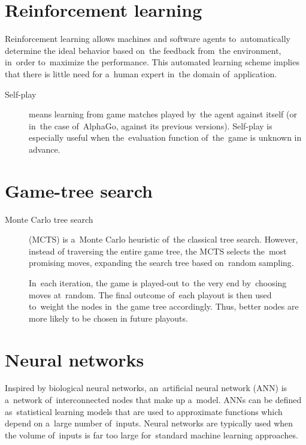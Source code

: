 \documentclass[a4paper,10pt]{article}
\begin{document}
\section{Reinforcement learning}
Reinforcement learning allows machines and software agents to~automatically determine the ideal behavior based on~the feedback from~the environment, in~order to~maximize the performance.
This automated learning scheme implies that there is little need for a~human expert in~the domain of~application.

\begin{description}
  \item [Self-play] means learning from game matches played by~the agent against itself (or in~the case of~AlphaGo, against its previous versions).
    Self-play is especially useful when the~evaluation function of~the~game is unknown in advance.
\end{description}

\section{Game-tree search}
\begin{description}
  \item [Monte Carlo tree search] (MCTS) is a~Monte Carlo heuristic of~the classical tree search.
    However, instead of traversing the entire game tree, the MCTS selects the~most promising moves, expanding the search tree based on~random sampling.

    In~each iteration, the game is played-out to~the very end by~choosing moves at~random.
    The final outcome of~each playout is then used to~weight the nodes in~the game tree accordingly.
    Thus, better nodes are more likely to be chosen in future playouts.
\end{description}

\section{Neural networks}
Inspired by biological neural networks, an~artificial neural network (ANN) is a~network of~interconnected nodes that make up a~model.
ANNs can be defined as~statistical learning models that are used to approximate functions which depend on a~large number of~inputs.
Neural networks are typically used when the volume of~inputs is far too large for~standard machine learning approaches.
\end{document}
